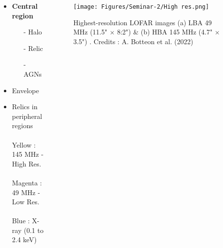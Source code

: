\documentclass[aspectratio=169]{beamer}
\begin{document}
\begin{markdown}
\begin{frame}{}


\begin{columns}
    \begin{column}{0.3\textwidth} 
         \begin{itemize}
             \item {\textbf{Central region}}
                \begin{itemize}
                    \item[-] Halo
                    \item[-] Relic
                    \item[-] AGNs
                \end{itemize} 
             \item Envelope
             \item Relics in peripheral regions 
             \\\\ \vspace{16mm} \hspace{-4mm}
             \scriptsize{
             Yellow : 145 MHz - High Res. \\\\ \hspace{-3mm}
             Magenta : 49 MHz - Low Res.\\\\ \hspace{-3mm}
             Blue : X-ray (0.1 to 2.4 keV)}
        \end{itemize}
    \end{column}
    \begin{column}{0.8\textwidth}
         \vspace{-2mm}
          \begin{figure}[!htbp]
          \centering
          \texttt{[image: Figures/Seminar-2/High res.png]}
          \vspace*{-1mm}
          \caption{Highest-resolution LOFAR images (a) LBA 49 MHz  (11.5" $\times$ 8:2") \& (b) HBA 145 MHz (4.7" $\times$ 3.5") . Credits :  A. Botteon et al. (2022)}
          \label{}
        \end{figure}
    \end{column}
\end{columns}

\end{frame}



\end{markdown}
\end{document}
